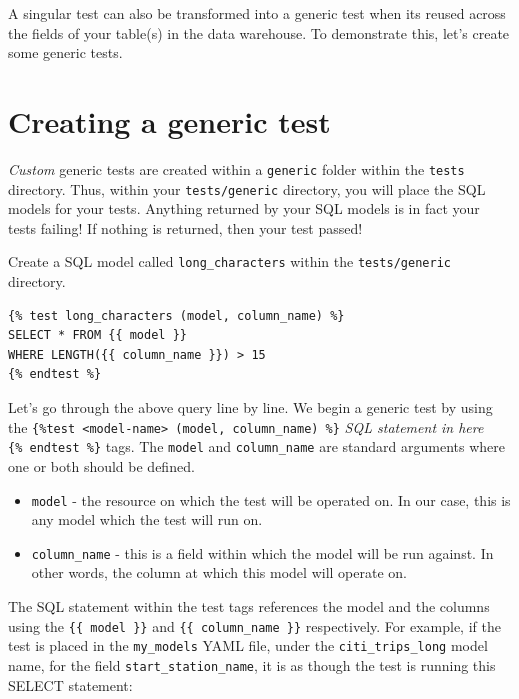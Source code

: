 \documentclass[
]{book}
\begin{document}
A singular test can also be transformed into a generic test when its reused across the fields of your table(s) in the data warehouse. To demonstrate this, let's create some generic tests.

\hypertarget{creating-a-generic-test}{%
\section{Creating a generic test}\label{creating-a-generic-test}}

\emph{Custom} generic tests are created within a \texttt{generic} folder within the \texttt{tests} directory. Thus, within your \texttt{tests/generic} directory, you will place the SQL models for your tests. Anything returned by your SQL models is in fact your tests failing! If nothing is returned, then your test passed!

Create a SQL model called \texttt{long\_characters} within the \texttt{tests/generic} directory.

\begin{verbatim}
{% test long_characters (model, column_name) %}
SELECT * FROM {{ model }}
WHERE LENGTH({{ column_name }}) > 15 
{% endtest %}
\end{verbatim}

Let's go through the above query line by line. We begin a generic test by using the \texttt{\{\%test\ \textless{}model-name\textgreater{}\ (model,\ column\_name)\ \%\}} \emph{SQL statement in here} \texttt{\{\%\ endtest\ \%\}} tags. The \texttt{model} and \texttt{column\_name} are standard arguments where one or both should be defined.

\begin{itemize}
\item
  \texttt{model} - the resource on which the test will be operated on. In our case, this is any model which the test will run on.
\item
  \texttt{column\_name} - this is a field within which the model will be run against. In other words, the column at which this model will operate on.
\end{itemize}

The SQL statement within the test tags references the model and the columns using the \texttt{\{\{\ model\ \}\}} and \texttt{\{\{\ column\_name\ \}\}} respectively. For example, if the test is placed in the \texttt{my\_models} YAML file, under the \texttt{citi\_trips\_long} model name, for the field \texttt{start\_station\_name}, it is as though the test is running this SELECT statement:
\end{document}
